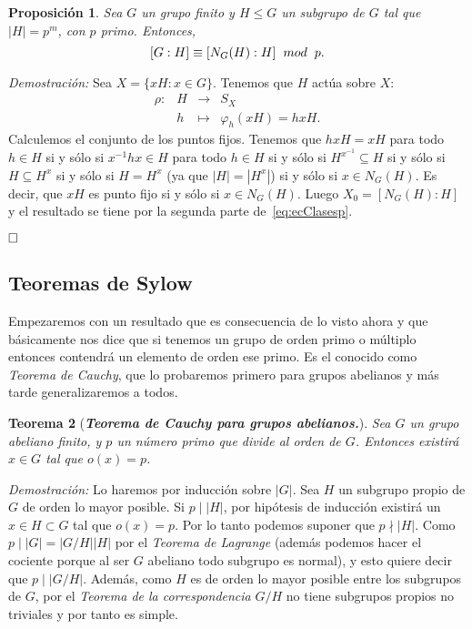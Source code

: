 \documentclass[12pt]{article}
\newtheorem{theorem}{Teorema}[section]
\newtheorem{proposition}[theorem]{Proposición}
\begin{document}
\begin{proposition}\label{eq:indiceNormalizador} Sea $G$ un grupo finito y $H \leq G$ un subgrupo de $G$ tal que $|H| = p^{m}$, con $p$ primo. Entonces, $$[G:H] \equiv [N_{G}(H):H] \hspace{0.2cm} mod \hspace{0.2cm} p.$$
\end{proposition}
\emph{Demostración: }Sea $X = \lbrace xH : x \in G \rbrace$. Tenemos que $H$ actúa sobre $X$: $$\begin{array}{rccl}
\rho\colon &H& \longrightarrow &S_{X}\\
&h& \longmapsto &\varphi_{h}(xH) =hxH.
\end{array}
$$
Calculemos el conjunto de los puntos fijos. Tenemos que $hxH = xH$ para todo $h \in H$ si y sólo si $x^{-1}hx \in H$ para todo $h \in H$ si y sólo si $H^{x^{-1}} \subseteq H$ si y sólo si $H \subseteq H^{x}$ si y sólo si $H = H^{x}$ (ya que $|H| = |H^{x}|$) si y sólo si $x \in N_{G}(H)$. Es decir, que $xH$ es punto fijo si y sólo si $x \in N_{G}(H)$. Luego $X_{0}=[N_{G}(H):H]$ y el resultado se tiene por la segunda parte de~\ref{eq:ecClasesp}.

$\hfill \square$

\subsection{Teoremas de Sylow}

Empezaremos con un resultado que es consecuencia de lo visto ahora y que básicamente nos dice que si tenemos un grupo de orden primo o múltiplo entonces contendrá un elemento de orden ese primo. Es el conocido como \textit{Teorema de Cauchy}, que lo probaremos primero para grupos abelianos y más tarde generalizaremos a todos.

\begin{theorem}[\textit{\textbf{Teorema de Cauchy para grupos abelianos.}}]
Sea $G$ un grupo abeliano finito, y $p$ un número primo que divide al orden de $G$. Entonces existirá $x \in G$ tal que $o(x) = p$.
\end{theorem}
\emph{Demostración: } Lo haremos por inducción sobre $|G|$. Sea $H$ un subgrupo propio de $G$ de orden lo mayor posible. Si $p \mid |H|$, por hipótesis de inducción existirá un $x \in H \subset G$ tal que $o(x) = p$. Por lo tanto podemos suponer que $ p \nmid |H|$. Como $p \mid |G| = |G/H| |H|$ por el \textit{Teorema de Lagrange} (además podemos hacer el cociente porque al ser $G$ abeliano todo subgrupo es normal), y esto quiere decir que $p \mid |G/H|$. Además, como $H$ es de orden lo mayor posible entre los subgrupos de $G$, por el \textit{Teorema de la correspondencia} $G/H$ no tiene subgrupos propios no triviales y por tanto es simple.
\end{document}
